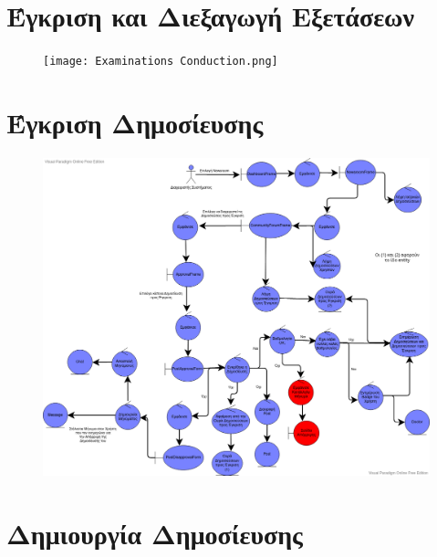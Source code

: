 \documentclass{article}
\begin{document}
\newpage

\section{Έγκριση και Διεξαγωγή Εξετάσεων}

\vspace{0.2cm}

\begin{figure}[!htb]
        \centering
        \texttt{[image: Εxaminations Conduction.png]}
\end{figure}

\newpage

\section{Έγκριση Δημοσίευσης}

\vspace{0.2cm}

\begin{figure}[!htb]
        \centering
        \includegraphics[width=1\textwidth]{Admin Approval.png}
\end{figure}

\newpage

\section{Δημιουργία Δημοσίευσης}

\vspace{0.2cm}
\end{document}
